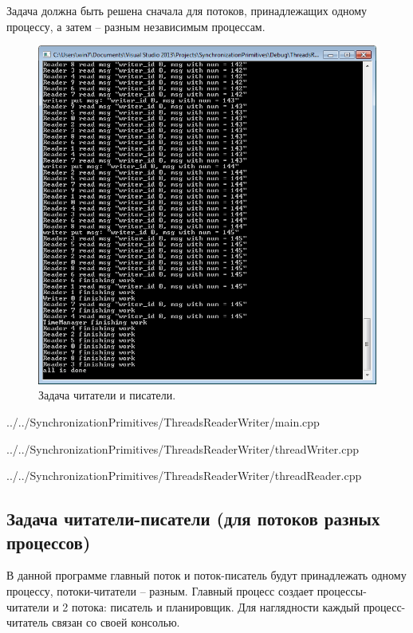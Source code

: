 \documentclass[a4paper, 12pt]{article}		%
\begin{document}
Задача должна быть решена сначала для потоков, принадлежащих одному процессу, а затем – разным независимым процессам.

\begin{figure}[h!]
\centering
\includegraphics[scale=1]{res/006}
\caption{Задача читатели и писатели.}
\end{figure}


{../../SynchronizationPrimitives/ThreadsReaderWriter/main.cpp}


{../../SynchronizationPrimitives/ThreadsReaderWriter/threadWriter.cpp}


{../../SynchronizationPrimitives/ThreadsReaderWriter/threadReader.cpp}

\newpage
\subsection{Задача читатели-писатели (для потоков разных процессов)}

В данной программе главный поток и поток-писатель будут принадлежать одному процессу, потоки-читатели – разным. Главный процесс создает процессы-читатели и 2 потока: писатель и планировщик. Для наглядности каждый процесс-читатель связан со своей консолью.
\end{document}
